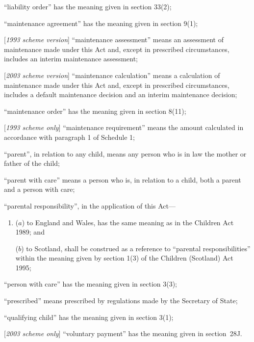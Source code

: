 \documentclass[12pt,a4paper]{article}
\begin{document}
\begin{enumerate}
    “liability order” has the meaning given in section 33(2);

    “maintenance agreement” has the meaning given in section 9(1);

    [\emph{1993 scheme version}] “maintenance assessment” means an assessment of maintenance made under this Act and, except in prescribed circumstances, includes an interim maintenance assessment;

[\emph{2003 scheme version}] “maintenance calculation” means a calculation of maintenance made under this Act and, except in prescribed circumstances, includes a default maintenance decision and an interim maintenance decision;

    “maintenance order” has the meaning given in section 8(11);

[\emph{1993 scheme only}]         “maintenance requirement” means the amount calculated in accordance with paragraph 1 of Schedule 1;

    “parent”, in relation to any child, means any person who is in law the mother or father of the child;

“parent with care” means a person who is, in relation to a child, both a parent and a person with care;


“parental responsibility”, in the application of this Act—
\begin{enumerate}\item[]
($a$) to England and Wales, has the same meaning as in the Children Act 1989; and

($b$) to Scotland, shall be construed as a reference to “parental responsibilities” within the meaning given by section 1(3) of the Children (Scotland) Act 1995;
\end{enumerate}


    “person with care” has the meaning given in section 3(3);

    “prescribed” means prescribed by regulations made by the Secretary of State;

    “qualifying child” has the meaning given in section 3(1);

[\emph{2003 scheme only}] “voluntary payment” has the meaning given in section~28J.
\end{enumerate}
\end{document}
